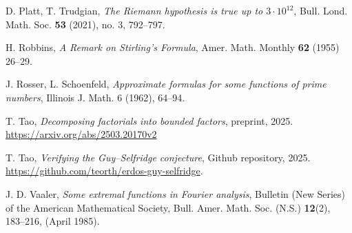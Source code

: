 \documentclass[12pt,a4paper,reqno]{amsart}
\numberwithin{equation}{section}
\theoremstyle{plain}
\theoremstyle{definition}
\begin{document}
\begin{thebibliography}{10}
D. Platt, T. Trudgian, \emph{The Riemann hypothesis is true up to $3\cdot10^{12}$}, Bull. Lond. Math. Soc. \textbf{53} (2021), no. 3, 792--797.

H. Robbins, \emph{A Remark on Stirling's Formula}, Amer. Math. Monthly \textbf{62} (1955) 26--29.


J. Rosser, L. Schoenfeld, \emph{Approximate formulas for some functions of prime numbers}, Illinois J. Math. 6 (1962), 64--94.

T. Tao, \emph{Decomposing factorials into bounded factors}, preprint, 2025. \url{https://arxiv.org/abs/2503.20170v2}

T. Tao, \emph{Verifying the Guy--Selfridge conjecture}, Github repository, 2025.  \url{https://github.com/teorth/erdos-guy-selfridge}.

J. D. Vaaler, \emph{Some extremal functions in Fourier analysis}, Bulletin (New Series) of the American Mathematical Society, Bull. Amer. Math. Soc. (N.S.) \textbf{12}(2), 183--216, (April 1985).

\end{thebibliography}
\end{document}
